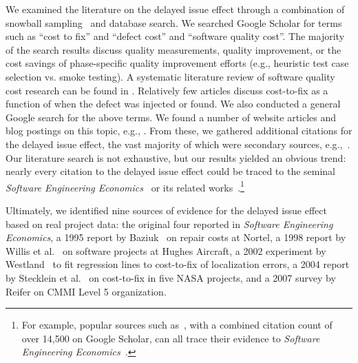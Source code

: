 \documentclass[smallcondensed]{svjour3}
\begin{document}
We examined the literature on the delayed issue effect through a combination of snowball sampling~\cite{wohlin2014guidelines} and database search. We searched Google Scholar for terms such as ``cost to fix'' and ``defect cost'' and ``software quality cost''. The majority of the search results discuss quality measurements, quality improvement, or the cost savings of phase-specific quality improvement efforts (e.g., heuristic test case selection vs. smoke testing). A systematic literature review of software quality cost research can be found in \cite{karg2011systematic}. Relatively few articles discuss cost-to-fix as a function of when the defect was injected or found. We also conducted a general Google search for the above terms. We found a number of website articles and blog postings on this topic, e.g., \cite{IfSQ2013,Soni2016,Parker2013,Gordon2016}. From these, we gathered additional citations for the delayed issue effect, the vast majority of which were secondary sources, e.g.,~\cite{Leffingwell96,mead2004software,mcconnell1996software,mcconnell01,Tassey2002,boehm2012}. Our literature search is not exhaustive, but our results yielded an obvious trend: nearly every citation to the delayed issue effect could be traced to the seminal \textit{Software Engineering Economics}~\cite{Boehm81} or its related works~\cite{boehm88,boehm01}.\footnote{For example, popular sources such as~\cite{pressman2005software, boehm01,glass02,endres03}, with a combined citation count of over 14,500 on Google Scholar, can all trace their evidence to \textit{Software Engineering Economics}~\cite{Boehm81}.}


Ultimately, we identified nine sources of evidence for the delayed issue effect based on real project data: the original four \cite{Fagan76,Boehm76,Daly77,Stephenson76} reported in \textit{Software Engineering Economics}\cite{Boehm81}, a 1995 report by Baziuk~\cite{baziuk1995bnr} on repair costs at Nortel, a 1998 report by Willis et al.~\cite{willis1998hughes} on software projects at Hughes Aircraft, a 2002 experiment by Westland~\cite{westland2002cost} to fit regression lines to cost-to-fix of localization errors, a 2004 report by Stecklein et al.~\cite{steck04} on cost-to-fix in five NASA projects, and a 2007 survey by Reifer on CMMI Level 5 organization\cite{reifer2007profiles}.
\end{document}
